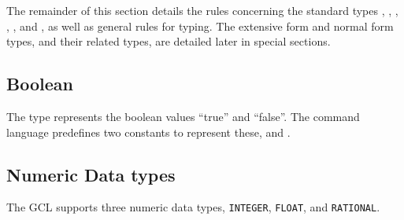 The remainder of this section details the rules concerning the
standard types
, , , , ,
 and , as well as general rules for typing.
The extensive form and normal form types, and their related types, are
detailed later in special sections.


\subsection{Boolean}

The  type represents the boolean values
``true'' and ``false''.  The command language predefines two constants
to represent these,  and .

\subsection{Numeric Data types}

The GCL supports three numeric data types, \verb+INTEGER+,
\verb+FLOAT+, and \verb+RATIONAL+.

